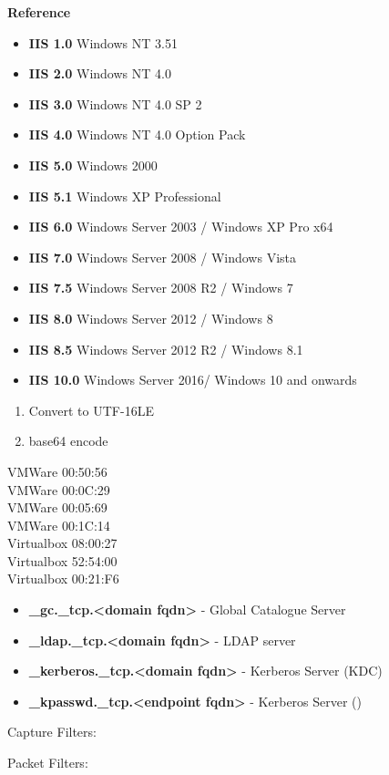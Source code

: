 \documentclass[a4paper,10pt]{article}
\begin{document}
\newpage
\Huge{\textbf{Reference}}
\newline
\normalsize
\begin{tcolorbox}[breakable,title=IIS Versions]
\begin{itemize}
	\itemsep0em
	\item \textbf{IIS 1.0} Windows NT 3.51
	\item \textbf{IIS 2.0} Windows NT 4.0
	\item \textbf{IIS 3.0} Windows NT 4.0 SP 2
	\item \textbf{IIS 4.0} Windows NT 4.0 Option Pack
	\item \textbf{IIS 5.0} Windows 2000
	\item \textbf{IIS 5.1} Windows XP Professional
	\item \textbf{IIS 6.0} Windows Server 2003 / Windows XP Pro x64
	\item \textbf{IIS 7.0} Windows Server 2008 / Windows Vista
	\item \textbf{IIS 7.5} Windows Server 2008 R2 / Windows 7
	\item \textbf{IIS 8.0} Windows Server 2012 / Windows 8
	\item \textbf{IIS 8.5} Windows Server 2012 R2 / Windows 8.1
	\item \textbf{IIS 10.0} Windows Server 2016/ Windows 10 and onwards
\end{itemize}
\end{tcolorbox}
\begin{tcolorbox}[breakable,title=Creating Powershell encoded payloads]
	\begin{enumerate}
		\itemsep0em
		\item Convert to UTF-16LE
		\item base64 encode
	\end{enumerate}
\end{tcolorbox}
\begin{tcolorbox}[breakable,title=Common MAC Address vendors]
VMWare 00:50:56\\
VMWare 00:0C:29\\
VMWare 00:05:69\\
VMWare 00:1C:14\\
Virtualbox 08:00:27	\\
Virtualbox 52:54:00 \\
Virtualbox 00:21:F6
\end{tcolorbox}
\begin{tcolorbox}[breakable,title=Active Directory SRV records]
\begin{itemize}
	\itemsep0em
	\item \textbf{\_gc.\_tcp.<domain fqdn>} - Global Catalogue Server
	\item \textbf{\_ldap.\_tcp.<domain fqdn>} - LDAP server
	\item \textbf{\_kerberos.\_tcp.<domain fqdn>} - Kerberos Server (KDC)
	\item \textbf{\_kpasswd.\_tcp.<endpoint fqdn>} - Kerberos Server ()
\end{itemize}
\end{tcolorbox}
\begin{tcolorbox}[breakable,title=Wireshark Filters]
	Capture Filters:
	
	Packet Filters:
\end{tcolorbox}
\begin{tcolorbox}[breakable,title=tcpdump flags]
	
\end{tcolorbox}
\end{document}
